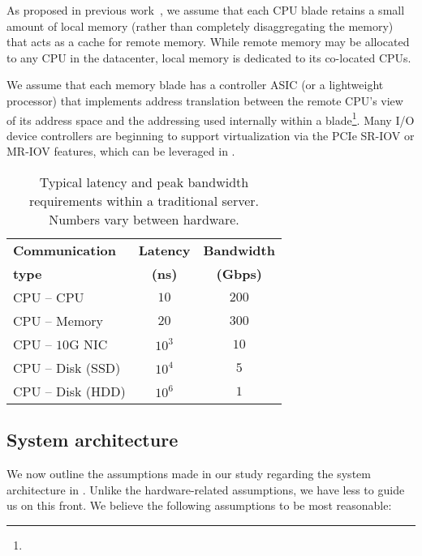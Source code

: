 As proposed in previous work~\cite{ddcHwDesign1}, we assume that each CPU blade retains a small amount of local memory (rather than completely disaggregating the memory) that acts as a cache for remote memory. While remote memory may be allocated to any CPU in the datacenter, local memory is dedicated to its co-located CPUs. 

We assume that each memory blade has a controller ASIC (or a lightweight processor) that implements address translation between the remote CPU's view of its address space and the addressing used internally within a blade{\footnote{}}. Many I/O device controllers are beginning to support virtualization via the PCIe SR-IOV or MR-IOV features, which can be leveraged in \dis. 

%
\begin{table}
	\centering
	\caption{\small{Typical latency and peak bandwidth requirements within a traditional server. Numbers vary between hardware.}}
	\label{tab:tech}
	\vspace{0.1in}
  \begin{tabular}{l|c|c}
	  \hline
		\textbf{Communication} & \textbf{Latency} & \textbf{Bandwidth}\\
		\textbf{type} & \textbf{(ns)} & \textbf{(Gbps)}\\\hline \hline
    CPU -- CPU & $10$ & $200$\\\hline
    CPU -- Memory & $20$ & $300$\\\hline
    CPU -- $10$G NIC & $10^3$ & $10$\\\hline
    CPU -- Disk (SSD) & $10^4$ & $5$\\\hline
    CPU -- Disk (HDD) & $10^6$ & $1$\\\hline
    \hline
\end{tabular}
\end{table}
%
\vspace{-0.1in}
\subsection{System architecture}
\vspace{-0.05in}
\label{ssec:system}
We now outline the assumptions made in our study regarding the system architecture in \dis. Unlike the hardware-related assumptions, we have less to guide us on this front. We believe the following assumptions to be most reasonable:


